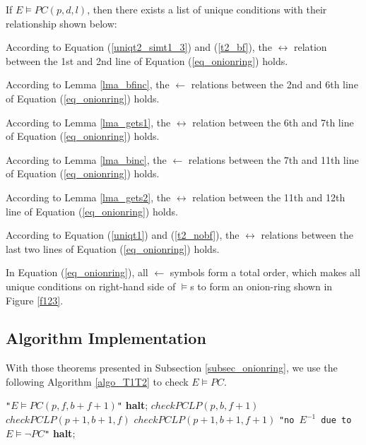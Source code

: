 \documentclass[journal]{IEEEtran}
\begin{document}
\begin{theorem}\label{thm_onionring}
If $E\vDash PC(p,d,l)$,
then there exists a list of unique conditions with their relationship shown below:
\begin{equation}\label{eq_onionring}
\end{equation}
\end{theorem}
\begin{IEEEproof}
According to Equation (\ref{uniqt2_simt1_3}) and (\ref{t2_bf}),
the $\boldsymbol{\leftrightarrow}$ relation between the 1st and 2nd line of Equation (\ref{eq_onionring}) holds.

According to Lemma \ref{lma_bfinc},
the $\boldsymbol{\gets}$ relations between the 2nd and 6th line of Equation (\ref{eq_onionring}) holds.

According to Lemma \ref{lma_gets1},
the $\boldsymbol{\leftrightarrow}$ relation between the 6th and 7th line of Equation (\ref{eq_onionring}) holds.

According to Lemma \ref{lma_binc},
the $\boldsymbol{\gets}$ relations between the 7th and 11th line of Equation (\ref{eq_onionring}) holds.

According to Lemma \ref{lma_gets2},
the $\boldsymbol{\leftrightarrow}$ relation between the 11th and 12th line of Equation (\ref{eq_onionring}) holds.

According to Equation (\ref{uniqt1}) and (\ref{t2_nobf}),
the $\boldsymbol{\leftrightarrow}$ relations between the last two lines of Equation (\ref{eq_onionring}) holds.
\end{IEEEproof}

In Equation (\ref{eq_onionring}),
all $\gets$ symbols form a total order,
which makes all unique conditions on right-hand side of $\vDash$s to form an onion-ring shown in Figure \ref{f123}.

\subsection{Algorithm Implementation}

With those theorems presented in Subsection \ref{subsec_onionring},
we use the following Algorithm \ref{algo_T1T2} to check $E\vDash PC$.

\begin{algorithm}
\caption{$checkPCLP(p,b,f)$}
\label{algo_T1T2}
\begin{algorithmic}[1]
\PRINT \texttt{"$E\vDash PC(p,f,b+f+1)$"}\label{lab_t1t2_t2nobf}
\STATE \textbf{halt};
\STATE $checkPCLP(p,b,f+1)$\label{lab_t1t2_t2f}
\STATE $checkPCLP(p+1,b+1,f)$\label{lab_t1t2_t2b}
\STATE $checkPCLP(p+1,b+1,f+1)$\label{lab_t1t2_t2bf}
\ELSE
\PRINT \texttt{"no $E^{-1}$ due to $E\vDash\neg PC$"}\label{lab_t1t2_sat}
\STATE \textbf{halt};
\ENDIF
\end{algorithmic}
\end{algorithm}
\end{document}
